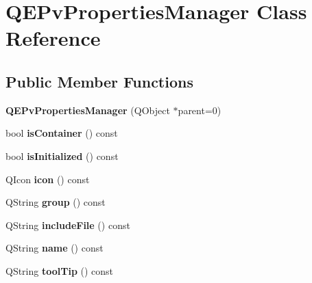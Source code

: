 \hypertarget{classQEPvPropertiesManager}{
\section{QEPvPropertiesManager Class Reference}
\label{classQEPvPropertiesManager}
}
\subsection*{Public Member Functions}
\begin{DoxyCompactItemize}
\item 
\hypertarget{classQEPvPropertiesManager_a940b8ee7a54702d8926b55dad64ce1b9}{
{\bfseries QEPvPropertiesManager} (QObject $\ast$parent=0)}
\label{classQEPvPropertiesManager_a940b8ee7a54702d8926b55dad64ce1b9}

\item 
\hypertarget{classQEPvPropertiesManager_a797c54aed3fceea90ceaa94716ffa3cf}{
bool {\bfseries isContainer} () const }
\label{classQEPvPropertiesManager_a797c54aed3fceea90ceaa94716ffa3cf}

\item 
\hypertarget{classQEPvPropertiesManager_a01ba7a8b403d8ada9a54d2bf9e29228a}{
bool {\bfseries isInitialized} () const }
\label{classQEPvPropertiesManager_a01ba7a8b403d8ada9a54d2bf9e29228a}

\item 
\hypertarget{classQEPvPropertiesManager_aeb2f57ba672dc773af5fcef9762f08f7}{
QIcon {\bfseries icon} () const }
\label{classQEPvPropertiesManager_aeb2f57ba672dc773af5fcef9762f08f7}

\item 
\hypertarget{classQEPvPropertiesManager_ab7a11c421443d7d1e7c85a600786d32d}{
QString {\bfseries group} () const }
\label{classQEPvPropertiesManager_ab7a11c421443d7d1e7c85a600786d32d}

\item 
\hypertarget{classQEPvPropertiesManager_aed6b6d8499768f836b99f00c261ed6b4}{
QString {\bfseries includeFile} () const }
\label{classQEPvPropertiesManager_aed6b6d8499768f836b99f00c261ed6b4}

\item 
\hypertarget{classQEPvPropertiesManager_a0a9e22d8bccc375ac9c56a70002bec8e}{
QString {\bfseries name} () const }
\label{classQEPvPropertiesManager_a0a9e22d8bccc375ac9c56a70002bec8e}

\item 
\hypertarget{classQEPvPropertiesManager_ab6818d1aa8be4b0923f8fd4a81856db8}{
QString {\bfseries toolTip} () const }
\label{classQEPvPropertiesManager_ab6818d1aa8be4b0923f8fd4a81856db8}


\end{DoxyCompactItemize}
